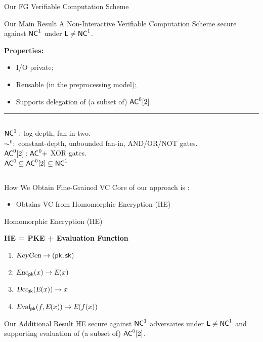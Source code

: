 \begin{frame}{Our FG Verifiable Computation Scheme}

\begin{block}{Our Main Result}
	A Non-Interactive Verifiable Computation Scheme secure against ${\mathsf{NC}}^1$ under ${\mathsf{L}} \not = {\mathsf{NC}}^1$.
\end{block}
\pause
\textbf{Properties:}
\begin{itemize}[<+- | alert@+>]
	\item I/O private;
	\item Reusable (in the preprocessing model);
	\item Supports delegation of (a subset of) ${\mathsf{AC}}^0[2]$.
\end{itemize}
\pause
\bigskip
\hrule
\medskip
\begin{columns}
	${\mathsf{NC}}^1: $ log-depth, fan-in two.\\\vspace{1cm}
	\pause
	$\AC^0: $ constant-depth, unbounded fan-in, AND/OR/NOT gates.\\\vspace{1cm}
	\pause
		${\mathsf{AC}}^0[2]: {\mathsf{AC}}^0 + $  XOR gates.\\\vspace{1cm} \pause
		${\mathsf{AC}}^0 \subsetneq {\ensuremath{\mathsf{AC}}}^0[2] \subsetneq {\ensuremath{\mathsf{NC}}}^1$ 
\end{columns}
\end{frame}


\begin{frame}{How We Obtain Fine-Grained VC}
	Core of our approach is \cite{ckv10}:
	\begin{itemize}
		\item  Obtains VC from Homomorphic Encryption (HE)
	\end{itemize}
\end{frame}

\def\E{\func{E}}

\begin{frame}{Homomorphic Encryption (HE)}
	\begin{center} \textbf{HE = PKE + Evaluation Function} \end{center}
	\pause
	\begin{enumerate}
		\item ${\textsl{KeyGen}} \to (\mathsf{pk}, \mathsf{sk})$
		\item $\func{Enc}_{\pk}(x) \to \E(x)$
		\item $\func{Dec}_{\sk}(\E(x)) \to x$
		\pause  
		\item $\func{Eval}_{\pk}(f, \E(x)) \to \E(f(x))$
	\end{enumerate}
	\pause
	\bigskip
	\begin{block}{Our Additional Result}
		HE secure against ${\mathsf{NC}}^1$ adversaries under ${\mathsf{L}} \not = {\mathsf{NC}}^1$ and supporting evaluation of (a subset of) ${\mathsf{AC}}^0[2]$.
	\end{block}
\end{frame}

